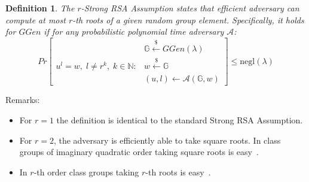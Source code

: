 \documentclass[a4paper]{article}
\newtheorem{definition}{Definition}
\begin{document}
\begin{definition}
The \emph{$r$-Strong RSA Assumption} states that 
efficient adversary can compute at most $r$-th roots of a given random group element. Specifically,
it holds for $GGen$ if for any probabilistic polynomial time adversary $\mathcal{A}$:
$$
Pr
\begin{bmatrix}
&\mathbb{G}\xleftarrow{\$}GGen(\lambda)\\
u^l = w,\; l\neq r^k,\;k\in\mathbb{N} :
& w\xleftarrow{\$}\mathbb{G}\\
&(u,l) \xleftarrow{} \mathcal{A}(\mathbb{G},w)
\end{bmatrix}\leq \mathrm{negl}(\lambda)
$$
\end{definition}
Remarks:
\begin{itemize}
    \item For $r = 1$ the definition is identical to the standard Strong RSA Assumption. 
    \item For $r = 2$, the adversary
is efficiently able to take square roots. In class groups of imaginary quadratic order taking
square roots is easy~\cite{cryptoeprint:2019:1229}.
    \item In $r$-th order class groups taking $r$-th roots is easy~\cite{cryptoeprint:2019:1229}.
    \end{itemize}
\end{document}
